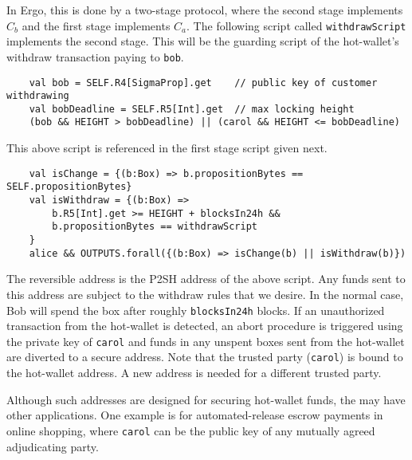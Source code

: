 \documentclass[runningheads]{llncs}
\begin{document}
In Ergo, this is done by a two-stage protocol, where the second stage implements $C_{b}$ and the first stage implements $C_{a}$. 
The following script called \texttt{withdrawScript} implements the second stage. This will be the guarding script of the hot-wallet's withdraw transaction paying to \texttt{bob}.

\small{
	\begin{verbatim}
	val bob = SELF.R4[SigmaProp].get    // public key of customer withdrawing
	val bobDeadline = SELF.R5[Int].get  // max locking height
	(bob && HEIGHT > bobDeadline) || (carol && HEIGHT <= bobDeadline)
	\end{verbatim}
}

This above script is referenced in the first stage script given next. 

\small{
	\begin{verbatim}
	val isChange = {(b:Box) => b.propositionBytes == SELF.propositionBytes}
	val isWithdraw = {(b:Box) => 
	    b.R5[Int].get >= HEIGHT + blocksIn24h && 
	    b.propositionBytes == withdrawScript
	}
	alice && OUTPUTS.forall({(b:Box) => isChange(b) || isWithdraw(b)})
	\end{verbatim}
}

The reversible address is the P2SH address of the above script. Any funds sent to this address are subject to the withdraw rules that we desire.
In the normal case, Bob will spend the box after roughly \texttt{blocksIn24h} blocks. If an unauthorized transaction from the hot-wallet is detected, an abort procedure is triggered using the private key of \texttt{carol} and funds in any unspent boxes sent from the hot-wallet are diverted to a secure address. %
Note that the trusted party (\texttt{carol}) is bound to the hot-wallet address. A new address is needed for a different trusted party. 

Although such addresses are designed for securing hot-wallet funds, the may have other applications. One example is for automated-release escrow payments in online shopping, where \texttt{carol} can be the public key of any mutually agreed adjudicating party. 


%   
\end{document}
